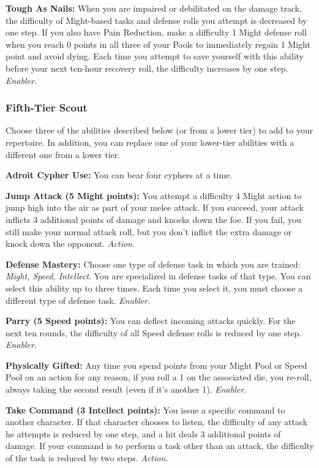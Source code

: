 \documentclass[a4paper,10pt,final,twocolumn,oneside]{book}
\newcommand{\itemAbility}[2]{\textcolor{25gray}{\textbullet\textbf{ #1:}}{ #2}\par}
\newcommand{\enabler}{\textit{ Enabler.}}
\newcommand{\action}{\textit{ Action.}}
\begin{document}
\itemAbility{Tough As Nails}{When you are impaired or debilitated on the damage track, the difficulty of Might-based tasks and defense rolls you attempt is decreased by one step. If you also have Pain Reduction, make a difficulty 1 Might defense roll when you reach 0 points in all three of your Pools to immediately regain 1 Might point and avoid dying. Each time you attempt to save yourself with this ability before your next ten-hour recovery roll, the difficulty increases by one step.\enabler}


\subsubsection*{Fifth-Tier Scout}
\label{subsub:scoutFifthTier}

Choose three of the abilities described below (or from a lower tier) to add to your repertoire. In addition, you can replace one of your lower-tier abilities with a different one from a lower tier.

\itemAbility{Adroit Cypher Use}{You can bear four cyphers at a time.}

\itemAbility{Jump Attack (5 Might points)}{You attempt a difficulty 4 Might action to jump high into the air as part of your melee attack. If you succeed, your attack inflicts 3 additional points of damage and knocks down the foe. If you fail, you still make your normal attack roll, but you don’t inflict the extra damage or knock down the opponent.\action}

\itemAbility{Defense Mastery}{Choose one type of defense task in which you are trained: \textit{Might, Speed, Intellect}. You are specialized in defense tasks of that type. You can select this ability up to three times. Each time you select it, you must choose a different type of defense task.\enabler}

\itemAbility{Parry (5 Speed points)}{You can deflect incoming attacks quickly. For the next ten rounds, the difficulty of all Speed defense rolls is reduced by one step.\enabler}

\itemAbility{Physically Gifted}{Any time you spend points from your Might Pool or Speed Pool on an action for any reason, if you roll a 1 on the associated die, you re-roll, always taking the second result (even if it’s another 1).\enabler}

\itemAbility{Take Command (3 Intellect points)}{You issue a specific command to another character. If that character chooses to listen, the difficulty of any attack he attempts is reduced by one step, and a hit deals 3 additional points of damage. If your command is to perform a task other than an attack, the difficulty of the task is reduced by two steps.\action}
\end{document}
